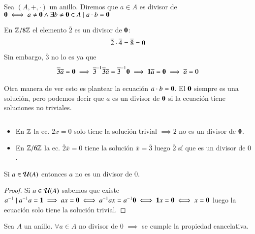 \begin{dfn}[Divisor de 0]
	Sea $(A, +, \cdot)$ un anillo. Diremos que $a \in A$ es divisor de $\mathbf{0} \iff a \neq \mathbf{0} \land \exists b \neq \mathbf{0} \in A \mid a\cdot b = \mathbf{0}$
\end{dfn}

\begin{ej}
	En $\mathbb{Z}/8\mathbb{Z}$ el elemento $\overline{2}$ es un divisor de $\mathbf{0}$:
	\begin{align*}
		\overline{2}\cdot\overline{4} = \overline{8} = \mathbf{0}
	\end{align*}
	Sin embargo, $\overline{3}$ no lo es ya que
	\begin{align*}
		\overline{3}\overline{a} = \mathbf{0} \implies \overline{3}^{-1}\overline{3}\overline{a} = \overline{3}^{-1}\mathbf{0} \implies \mathbf{1} \overline{a} = \mathbf{0} \implies \overline{a} = 0
	\end{align*}
\end{ej}

Otra manera de ver esto es plantear la ecuación $a \cdot b = \mathbf{0}$. El $\mathbf{0}$ siempre es una solución, pero podemos decir que $a$ es un divisor de $\mathbf{0}$ si la ecuación tiene soluciones no triviales.

\begin{ej}$ $\newline
	\begin{itemize}
		\item En $\mathbb{Z}$ la ec. $2x = 0$ solo tiene la solución trivial $\implies 2$ no es un divisor de $\mathbf{0}$.
		\item En $\mathbb{Z}/6\mathbb{Z}$ la ec. $\overline{2}\overline{x} = 0$ tiene la solución $\overline{x} = \overline{3}$ luego $\overline{2}$ sí que es un divisor de $0$.
	\end{itemize}
\end{ej}

\begin{pro}
	Si $a \in \mathcal{U}(A)$ entonces $a$ no es un divisor de $0$.
\end{pro}

\begin{proof}
	Si $a \in \mathcal{U}(A)$ sabemos que existe $a^{-1} \mid a^{-1}a = \mathbf{1} \implies ax = \mathbf{0} \iff a^{-1}ax = a^{-1} \mathbf{0} \iff \mathbf{1} x = \mathbf{0} \iff x = \mathbf{0}$ luego la ecuación solo tiene la solución trivial.
\end{proof}

\begin{pro}
	Sea $A$ un anillo. $\forall a \in A$ no divisor de 0 $\implies$ se cumple la propiedad cancelativa.
\end{pro}

